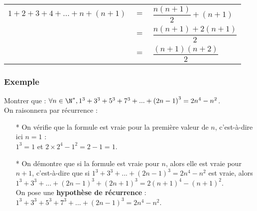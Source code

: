 \vspace*{.3cm}

\begin{tabular}{lll}
$1 + 2 + 3 + 4 + ... + n + \left(n+1\right)$ & $ = $ & $ \dfrac{n\left(n+1\right)}{2} + \left(n+1\right)$ \vspace*{.3cm} \\
& $=$ & $\dfrac{n\left(n+1\right) + 2\left(n+1\right)}{2}$ \vspace*{.3cm} \\
& $=$ & $\dfrac{\left(n+1\right)\left(n+2\right)}{2}$ \vspace*{.3cm} \\
\end{tabular}

\vspace*{-.6cm}

\subsubsection{Exemple }

Montrer que : $\forall n \in \N^*, 1^3 + 3^3 + 5^3 + 7^3 + ... + \left(2n - 1\right)^3 = 2n^4 - n^2$. \\ %

On raisonnera par récurrence : \\

\begin{itemize}

\item[*] On vérifie que la formule est vraie pour la première valeur de $n$, c'est-à-dire ici $n = 1$ :  \vspace{.3cm} \\ $1^3 = 1$ et $2 \times 2^4 - 1^2 = 2 - 1 = 1$. \\

\item[*] On démontre que si la formule est vraie pour $n$, alors elle est vraie pour $n+1$, c'est-à-dire que si $1^3 + 3^3 + ... + \left(2n-1\right)^3 = 2n^4 - n^2$ est vraie, alors $1^3 + 3^3 + ... + \left(2n-1\right)^3 + \left(2n+1\right)^3 = 2\left(n+1\right)^4 - \left(n+1\right)^2$. \vspace{.3cm} \\ On pose une \textbf{hypothèse de récurrence} : $1^3 + 3^3 + 5^3 + 7^3 + ... + \left(2n-1\right)^3 = 2n^4 - n^2$.
\end{itemize}

\vspace*{.3cm}

